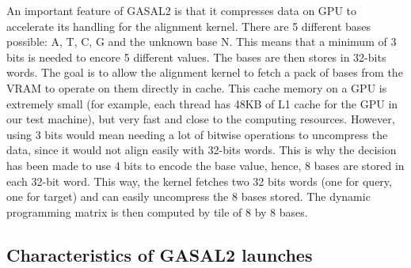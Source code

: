 %		
%			
%			
%			
%		
%		
%	
%		
%

An important feature of GASAL2 is that it compresses data on GPU to accelerate its handling for the alignment kernel. There are 5 different bases possible: A, T, C, G and the unknown base N. This means that a minimum of 3 bits is needed to encore 5 different values. The bases are then stores in 32-bits words. The goal is to allow the alignment kernel to fetch a pack of bases from the VRAM to operate on them directly in cache. This cache memory on a GPU is extremely small (for example, each thread has 48KB of L1 cache for the GPU in our test machine\cite{nvidia:keplerarch}), but very fast and close to the computing resources.
However, using 3 bits would mean needing a lot of bitwise operations to uncompress the data, since it would not align easily with 32-bits words. This is why the decision has been made to use 4 bits to encode the base value, hence, 8 bases are stored in each 32-bit word. This way, the kernel fetches two 32 bits words (one for query, one for target) and can easily uncompress the 8 bases stored. The dynamic programming matrix is then computed by tile of 8 by 8 bases.


\subsection{Characteristics of GASAL2 launches}

